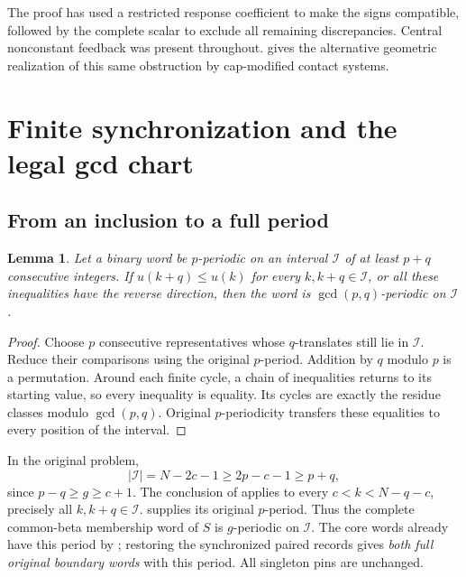 \documentclass[11pt,a4paper]{amsart}
\numberwithin{equation}{section}
\theoremstyle{plain}
\newtheorem{lemma}[theorem]{Lemma}
\theoremstyle{definition}
\begin{document}
The proof has used a restricted response coefficient to make the signs
compatible, followed by the complete scalar to exclude all remaining
discrepancies.  Central nonconstant feedback was present throughout.
 gives the alternative geometric realization of this
same obstruction by cap-modified contact systems.


\section{Finite synchronization and the legal gcd chart}\label{sec:fold}

\subsection{From an inclusion to a full period}

\begin{lemma}\label{lem:cycles}
Let a binary word be \(p\)-periodic on an interval \(\mathcal I\) of at least
\(p+q\) consecutive integers.  If \(u(k+q)\le u(k)\) for every
\(k,k+q\in\mathcal I\), or all these inequalities have the reverse
direction, then the word is \(\gcd(p,q)\)-periodic on \(\mathcal I\).
\end{lemma}
\begin{proof}
Choose \(p\) consecutive representatives whose \(q\)-translates still lie in
\(\mathcal I\).  Reduce their comparisons using the original \(p\)-period.
Addition by \(q\) modulo \(p\) is a permutation.  Around each finite cycle,
a chain of inequalities returns to its starting value, so every
inequality is equality.  Its cycles are exactly the residue classes
modulo \(\gcd(p,q)\).  Original \(p\)-periodicity transfers these equalities to
every position of the interval.
\end{proof}

In the original problem,
\begin{equation}\label{eq:cycle-budget}
 |\mathcal I|=N-2c-1\ge2p-c-1\ge p+q,
\end{equation}
since \(p-q\ge g\ge c+1\).  The conclusion of
 applies to every \(c<k<N-q-c\), precisely
all \(k,k+q\in\mathcal I\).   supplies its
original \(p\)-period.  Thus the complete common-beta membership word of
\(S\) is \(g\)-periodic on \(\mathcal I\).  The core words already have this
period by ; restoring the synchronized paired
records gives \emph{both full original boundary words} with this period.
All singleton pins are unchanged.
\end{document}
